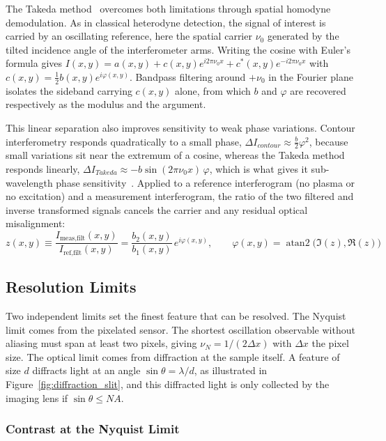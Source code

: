 The Takeda method~\cite{takeda1982fourier} overcomes both limitations through spatial homodyne demodulation. As in classical heterodyne detection, the signal of interest is carried by an oscillating reference, here the spatial carrier $\nu_0$ generated by the tilted incidence angle of the interferometer arms. Writing the cosine with Euler's formula gives $I(x,y) = a(x,y) + c(x,y)e^{i2\pi\nu_0 x} + c^*(x,y)e^{-i2\pi\nu_0 x}$ with $c(x,y) = \tfrac{1}{2}b(x,y)e^{i\varphi(x,y)}$. Bandpass filtering around $+\nu_0$ in the Fourier plane isolates the sideband carrying $c(x,y)$ alone, from which $b$ and $\varphi$ are recovered respectively as the modulus and the argument.

This linear separation also improves sensitivity to weak phase variations. Contour interferometry responds quadratically to a small phase, $\Delta I_{contour} \approx \tfrac{b}{2}\varphi^2$, because small variations sit near the extremum of a cosine, whereas the Takeda method responds linearly, $\Delta I_{Takeda} \approx -b\sin(2\pi\nu_0 x)\,\varphi$, which is what gives it sub-wavelength phase sensitivity~\cite{takeda1982fourier}. Applied to a reference interferogram (no plasma or no excitation) and a measurement interferogram, the ratio of the two filtered and inverse transformed signals cancels the carrier and any residual optical misalignment:
\begin{equation}
z(x,y) \equiv \frac{I_{\text{meas,filt}}(x,y)}{I_{\text{ref,filt}}(x,y)} = \frac{b_2(x,y)}{b_1(x,y)}\,e^{i\varphi(x,y)}, \qquad
\boxed{\varphi(x,y) = \operatorname{atan2}\big(\Im{(z)},\Re{(z)}\big)}
\end{equation}

\subsection{Resolution Limits}

Two independent limits set the finest feature that can be resolved. The Nyquist limit comes from the pixelated sensor. The shortest oscillation observable without aliasing must span at least two pixels, giving $\nu_N = 1/(2\Delta x)$ with $\Delta x$ the pixel size. The optical limit comes from diffraction at the sample itself. A feature of size $d$ diffracts light at an angle $\sin\theta = \lambda/d$, as illustrated in Figure~\ref{fig:diffraction_slit}, and this diffracted light is only collected by the imaging lens if $\sin\theta \le NA$.

\subsubsection{Contrast at the Nyquist Limit}

